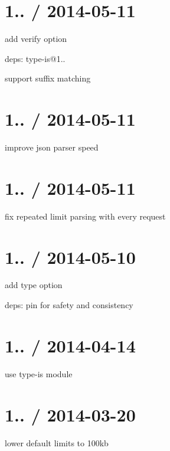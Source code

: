 \section*{1.. / 2014-\/05-\/11 }


\begin{DoxyItemize}
\item add {\ttfamily verify} option
\item deps\+: type-\/is@1..
\begin{DoxyItemize}
\item support suffix matching
\end{DoxyItemize}
\end{DoxyItemize}

\section*{1.. / 2014-\/05-\/11 }


\begin{DoxyItemize}
\item improve json parser speed
\end{DoxyItemize}

\section*{1.. / 2014-\/05-\/11 }


\begin{DoxyItemize}
\item fix repeated limit parsing with every request
\end{DoxyItemize}

\section*{1.. / 2014-\/05-\/10 }


\begin{DoxyItemize}
\item add {\ttfamily type} option
\item deps\+: pin for safety and consistency
\end{DoxyItemize}

\section*{1.. / 2014-\/04-\/14 }


\begin{DoxyItemize}
\item use {\ttfamily type-\/is} module
\end{DoxyItemize}

\section*{1.. / 2014-\/03-\/20 }


\begin{DoxyItemize}
\item lower default limits to 100kb 
\end{DoxyItemize}